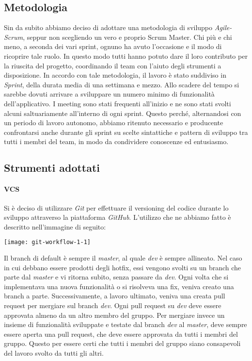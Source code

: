 \subsection{Metodologia}
Sin da subito abbiamo deciso di adottare una metodologia di sviluppo \textit{Agile-Scrum}, seppur non scegliendo un vero e proprio Scrum Master.
Chi più e chi meno, a seconda dei vari sprint, ognuno ha avuto l'occasione e il modo di ricoprire tale ruolo.
In questo modo tutti hanno potuto dare il loro contributo per la riuscita del progetto, coordinando il team con l'aiuto degli strumenti a disposizione.
In accordo con tale metodologia, il lavoro è stato suddiviso in \textit{Sprint}, della durata media di una settimana e mezzo.
Allo scadere del tempo si sarebbe dovuti arrivare a sviluppare un numero minimo di funzionalità dell'applicativo.
I meeting sono stati frequenti all'inizio e ne sono stati svolti alcuni saltuariamente all'interno di ogni sprint.
Questo perché, alternandosi con un periodo di lavoro autonomo, abbiamo ritenuto necessario e producente confrontarsi anche durante gli sprint su scelte sintattiche e pattern di sviluppo tra tutti i membri del team, in modo da condividere conoscenze ed entusiasmo.

\subsection{Strumenti adottati}

\paragraph{VCS}
Si è deciso di utilizzare \textit{Git} per effettuare il versioning del codice durante lo sviluppo attraverso la piattaforma \textit{GitHub}.
L’utilizzo che ne abbiamo fatto è descritto nell'immagine di seguito:
\begin{center}
    \texttt{[image: git-workflow-1-1]}
\end{center}
Il branch di default è sempre il \textit{master}, al quale \textit{dev} è sempre allineato.
Nel caso in cui debbano essere prodotti degli hotfix, essi vengono svolti su un branch che parte dal \textit{master} e vi ritorna subito, senza passare da \textit{dev}.
Ogni volta che si implementava una nuova funzionalità o si risolveva una fix, veniva creato una branch a parte.
Successivamente, a lavoro ultimato, veniva una creata pull request per mergiare sul branch \textit{dev}.
Ogni pull request su \textit{dev} deve essere approvata almeno da un altro membro del gruppo.
Per mergiare invece un insieme di funzionalità sviluppate e testate dal branch \textit{dev} al \textit{master}, deve sempre essere aperta una pull request, che deve essere approvata da tutti i membri del gruppo.
Questo per essere certi che tutti i membri del gruppo siano consapevoli del lavoro svolto da tutti gli altri.

